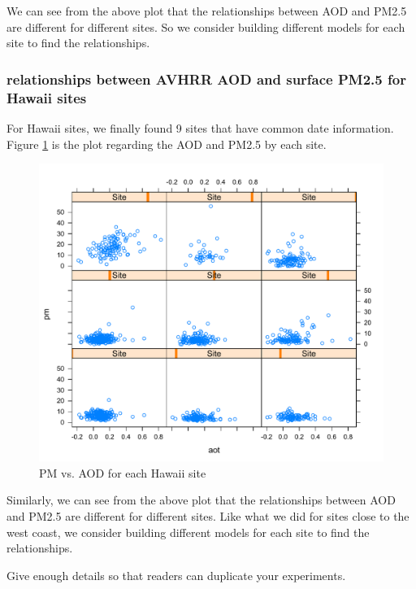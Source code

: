 \documentclass[10pt]{article}
\begin{document}
We can see from the above plot that the relationships between AOD and PM2.5 are different for different sites. So we consider building different models for each site to find the relationships.

\subsubsection{relationships between AVHRR AOD and surface PM2.5 for Hawaii sites}

For Hawaii sites, we finally found 9 sites that have common date information. Figure \ref{fig3.4} is the plot regarding the AOD and PM2.5 by each site. 

\begin{figure}[!h]
\centering
\includegraphics[width=\linewidth]{1.pdf}
\caption{PM vs. AOD for each Hawaii site}
\label{fig3.4}
\end{figure}

Similarly, we can see from the above plot that the relationships between AOD and PM2.5 are different for different sites. Like what we did for sites close to the west coast, we consider building different models for each site to find the relationships.



Give enough details so that readers can duplicate your experiments.
\end{document}
